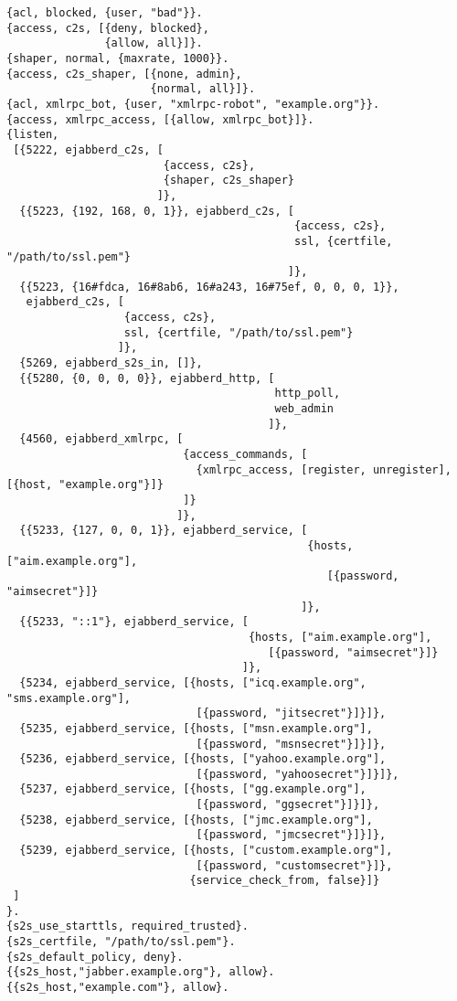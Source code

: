 \documentclass[a4paper,10pt]{book}
\begin{document}
\begin{verbatim}
{acl, blocked, {user, "bad"}}.
{access, c2s, [{deny, blocked},
               {allow, all}]}.
{shaper, normal, {maxrate, 1000}}.
{access, c2s_shaper, [{none, admin},
                      {normal, all}]}.
{acl, xmlrpc_bot, {user, "xmlrpc-robot", "example.org"}}.
{access, xmlrpc_access, [{allow, xmlrpc_bot}]}.
{listen,
 [{5222, ejabberd_c2s, [
                        {access, c2s},
                        {shaper, c2s_shaper}
                       ]},
  {{5223, {192, 168, 0, 1}}, ejabberd_c2s, [
                                            {access, c2s},
                                            ssl, {certfile, "/path/to/ssl.pem"}
                                           ]},
  {{5223, {16#fdca, 16#8ab6, 16#a243, 16#75ef, 0, 0, 0, 1}},
   ejabberd_c2s, [
                  {access, c2s},
                  ssl, {certfile, "/path/to/ssl.pem"}
                 ]},
  {5269, ejabberd_s2s_in, []},
  {{5280, {0, 0, 0, 0}}, ejabberd_http, [
                                         http_poll,
                                         web_admin
                                        ]},
  {4560, ejabberd_xmlrpc, [
                           {access_commands, [
                             {xmlrpc_access, [register, unregister], [{host, "example.org"}]}
                           ]}
                          ]},
  {{5233, {127, 0, 0, 1}}, ejabberd_service, [
                                              {hosts, ["aim.example.org"],
                                                 [{password, "aimsecret"}]}
                                             ]},
  {{5233, "::1"}, ejabberd_service, [
                                     {hosts, ["aim.example.org"],
                                        [{password, "aimsecret"}]}
                                    ]},
  {5234, ejabberd_service, [{hosts, ["icq.example.org", "sms.example.org"],
                             [{password, "jitsecret"}]}]},
  {5235, ejabberd_service, [{hosts, ["msn.example.org"],
                             [{password, "msnsecret"}]}]},
  {5236, ejabberd_service, [{hosts, ["yahoo.example.org"],
                             [{password, "yahoosecret"}]}]},
  {5237, ejabberd_service, [{hosts, ["gg.example.org"],
                             [{password, "ggsecret"}]}]},
  {5238, ejabberd_service, [{hosts, ["jmc.example.org"],
                             [{password, "jmcsecret"}]}]},
  {5239, ejabberd_service, [{hosts, ["custom.example.org"],
                             [{password, "customsecret"}]},
                            {service_check_from, false}]}
 ]
}.
{s2s_use_starttls, required_trusted}.
{s2s_certfile, "/path/to/ssl.pem"}.
{s2s_default_policy, deny}.
{{s2s_host,"jabber.example.org"}, allow}.
{{s2s_host,"example.com"}, allow}.
\end{verbatim}
\end{document}
